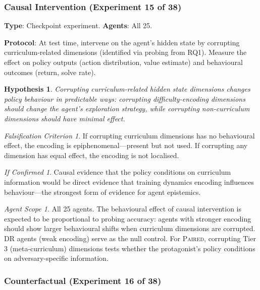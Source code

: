 \documentclass[11pt,a4paper]{article}
\newtheorem{hypothesis}{Hypothesis}[subsection]
\theoremstyle{remark}
\newtheorem*{falsification}{Falsification Criterion}
\newtheorem*{implication}{If Confirmed}
\newtheorem*{agentscope}{Agent Scope}
\newcommand{\paired}{\textsc{Paired}}
\newcommand{\dr}{\textsc{DR}}
\begin{document}
\subsubsection{Causal Intervention (Experiment 15 of 38)}
\label{exp:causal_intervention}

\textbf{Type}: Checkpoint experiment. \textbf{Agents}: All 25.

\textbf{Protocol}: At test time, intervene on the agent's hidden state by corrupting curriculum-related dimensions (identified via probing from RQ1). Measure the effect on policy outputs (action distribution, value estimate) and behavioural outcomes (return, solve rate).

\begin{hypothesis}
Corrupting curriculum-related hidden state dimensions changes policy behaviour in predictable ways: corrupting difficulty-encoding dimensions should change the agent's exploration strategy, while corrupting non-curriculum dimensions should have minimal effect.
\end{hypothesis}

\begin{falsification}
If corrupting curriculum dimensions has no behavioural effect, the encoding is epiphenomenal---present but not used. If corrupting any dimension has equal effect, the encoding is not localised.
\end{falsification}

\begin{implication}
Causal evidence that the policy conditions on curriculum information would be direct evidence that training dynamics encoding influences behaviour---the strongest form of evidence for agent epistemics.
\end{implication}

\begin{agentscope}
All 25 agents. The behavioural effect of causal intervention is expected to be proportional to probing accuracy: agents with stronger encoding should show larger behavioural shifts when curriculum dimensions are corrupted. \dr{} agents (weak encoding) serve as the null control. For \paired{}, corrupting Tier 3 (meta-curriculum) dimensions tests whether the protagonist's policy conditions on adversary-specific information.
\end{agentscope}

\subsubsection{Counterfactual (Experiment 16 of 38)}
\label{exp:counterfactual}
\end{document}
